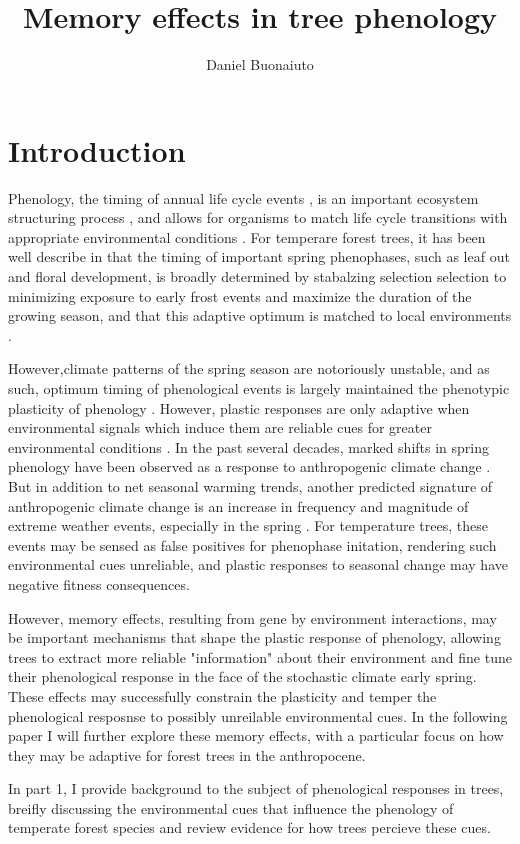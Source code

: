 \documentclass{article}\usepackage[]{graphicx}\usepackage[]{color}
\begin{document}
\title{Memory effects in tree phenology}
\author{Daniel Buonaiuto}
\data{\today}

\section*{Introduction}
Phenology, the timing of annual life cycle events \citep{}, is an important ecosystem structuring process \citep{}, and allows for organisms to match life cycle transitions with appropriate environmental conditions \citep{}. For temperare forest trees, it has been well describe in that the timing of important spring phenophases, such as leaf out and floral development, is broadly determined by stabalzing selection selection to minimizing exposure to early frost events and maximize the duration of the growing season, and that this adaptive optimum is matched to local environments \citep{Kremer1995}.
\par
However,climate patterns of the spring season are notoriously unstable, and as such, optimum timing of phenological events is largely maintained the phenotypic plasticity of phenology \citep{}. However, plastic responses are only adaptive when environmental signals which induce them are reliable cues for greater environmental conditions \citep{Hendry2016}. In the past several decades, marked shifts in spring phenology have been observed as a response to anthropogenic climate change \citep{Polgar2014, Wolkovich2012}. But in addition to net seasonal warming trends, another predicted signature of anthropogenic climate change is an increase in frequency and magnitude of extreme weather events, especially in the spring \cite{}. For temperature trees, these events may be sensed as false positives for phenophase initation, rendering such environmental cues unreliable, and plastic responses to seasonal change may have negative fitness consequences.
\par
However, memory effects, resulting from gene by environment interactions, may be important mechanisms that shape the plastic response of phenology, allowing trees to extract more reliable "information" about their environment and fine tune their phenological response in the face of the stochastic climate early spring. These effects may successfully constrain the plasticity and temper the phenological  resposnse to possibly unreilable environmental cues. In the following paper I will further explore these memory effects, with a particular focus on how they may be adaptive for forest trees in the anthropocene.
\par In part 1, I provide background to the subject of phenological responses in trees, breifly discussing the environmental cues that influence the phenology of temperate forest species and review evidence for how trees percieve these cues.\\
\end{document}
